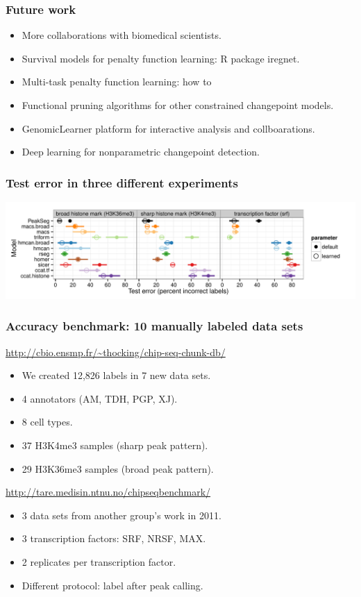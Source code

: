 \documentclass{beamer}
\begin{document}
\begin{frame}
  \frametitle{Future work}
  \begin{itemize}
  \item More collaborations with biomedical scientists.
  \item Survival models for penalty function learning: R package
    iregnet.
  \item Multi-task penalty function learning: how to 
  \item Functional pruning algorithms for other constrained
    changepoint models.
  \item GenomicLearner platform for interactive analysis and
    collboarations.
  \item Deep learning for nonparametric changepoint detection.
  \end{itemize}
\end{frame}

\begin{frame}
  \frametitle{Test error in three different experiments}
  \includegraphics[width=1.1\textwidth]{figure-test-error-dots-mean.pdf}
\end{frame}

\begin{frame}
  \frametitle{Accuracy benchmark: 10 manually labeled data sets}
  \url{http://cbio.ensmp.fr/~thocking/chip-seq-chunk-db/}
  \begin{itemize}
  \item We created 12,826 labels in 7 new data sets.
  \item 4 annotators (AM, TDH, PGP, XJ).
  \item 8 cell types.
  \item 37 H3K4me3 samples (sharp peak pattern).
  \item 29 H3K36me3 samples (broad peak pattern).
  \end{itemize}
  \vskip 1cm
  \url{http://tare.medisin.ntnu.no/chipseqbenchmark/}
  \begin{itemize}
  \item 3 data sets from another group's work in 2011.
  \item 3 transcription factors: SRF, NRSF, MAX.
  \item 2 replicates per transcription factor.
  \item Different protocol: label after peak calling.
  \end{itemize}
\end{frame}
\end{document}
